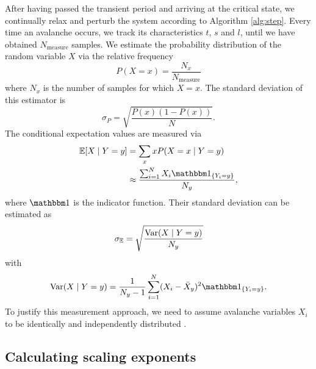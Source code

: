 After having passed the transient period and arriving at the critical state, we continually relax and perturb the system according to Algorithm \ref{alg:step}. Every time an avalanche occurs, we track its characteristics $t$, $s$ and $l$, until we have obtained $N_{\text{measure}}$ samples. We estimate the probability distribution of the random variable $X$ via the relative frequency
\begin{equation}
    P(X=x) = \frac{N_x}{N_{\text{measure}}} \label{eqn:pdf_est}
\end{equation}
where $N_x$ is the number of samples for which $X=x$. The standard deviation of this estimator is
\begin{equation}
    \sigma_P = \sqrt{\frac{P(x)(1-P(x))}{N}}. \label{eqn:pdf_err_est}
\end{equation}
The conditional expectation values are measured via
\begin{align}
    \bE [X\mid Y=y] &= \sum_x xP(X=x\mid Y=y) \nonumber \\
    &\approx \frac{\sum_{i=1}^N X_i\one_{\{Y_i=y\}}}{N_y}, \label{eqn:condexp_est}
\end{align}
where $\one$ is the indicator function. Their standard deviation can be estimated as
\begin{equation}
    \sigma_{\mathbb{E}} = \sqrt{\frac{\mathrm{Var}(X\mid Y=y)}{N_y}} \label{eqn:condexp_err_est}
\end{equation}
with
\begin{equation}
    \f{Var}(X\mid Y=y) = \frac{1}{N_y-1}\sum_{i=1}^N (X_i-\bar{X}_y)^2\one_{\{Y_i=y\}}.
\end{equation}
To justify this measurement approach, we need to assume avalanche variables $X_i$ to be identically and independently distributed \cite{pruessner2012numerical}.

\subsection{Calculating scaling exponents} \label{sec:calc-scaling-exponents}

